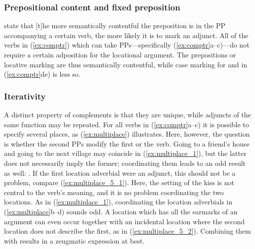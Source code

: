 \subsubsection{Prepositional content and fixed preposition}

\citet{needhamtoivonen2011} state that 
{[t]he more semantically contentful the preposition is in the PP accompanying a
certain verb, the more likely it is to mark an adjunct}. All of the verbs in
(\ref{ex:comptr}) which can take PPs---specifically (\ref{ex:comptr}a--c)---do
not require a certain adposition for the locational argument. The prepositions
or locative marking are thus semantically contentful, while case marking for
 and  in (\ref{ex:comptr}de) is
less so.

\subsubsection{Iterativity}

A distinct property of complements is that they are unique, while adjuncts of
the same function may be repeated. For all verbs in (\ref{ex:comptr}a--c) it is
possible to specify several places, as (\ref{ex:multiplace}) illustrates. Here,
however, the question is whether the second PPs modify the first or the verb.
Going to a friend's house and going to the next village may coincide in
(\ref{ex:multiplace_1}), but the latter does not necessarily imply the former;
coordinating them leads to an odd result as well: . If the first location adverbial were an adjunct, this
should not be a problem, compare (\ref{ex:multiplace_5_1}). Here, the setting
of the kiss is not central to the verb's meaning, and it is no problem
coordinating the two locations. As in (\ref{ex:multiplace_1}), coordinating the
location adverbials in (\ref{ex:multiplace}b–d) sounds odd. A location which
has all the earmarks of an argument can even occur together with an incidental
location where the second location does not describe the first, as in
(\ref{ex:multiplace_5_2}). Combining them with  results in a
zeugmatic expression at best.

